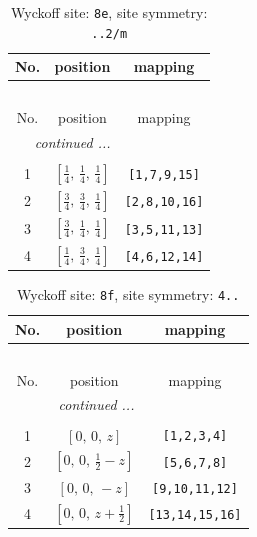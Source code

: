 \documentclass[fleqn,8pt]{jsarticle}
\begin{document}
\begin{longtable}{ccc}
\caption{Wyckoff site: {\tt 8e}, site symmetry: {\tt ..2/m}}
 \\
 \hline \hline
No. & position & mapping \\ \hline \endfirsthead

\multicolumn{2}{l}{\tablename\ \thetable{}} \\
 \hline \hline
No. & position & mapping \\ \hline \endhead

 \hline \hline
\multicolumn{2}{r}{\footnotesize\it continued ...} \\ \endfoot

 \hline \hline
\multicolumn{2}{r}{} \\ \endlastfoot

1 & $\left[ \frac{1}{4},\, \frac{1}{4},\, \frac{1}{4} \right]$ & {\tt [1,7,9,15]} \\ \hline
2 & $\left[ \frac{3}{4},\, \frac{3}{4},\, \frac{1}{4} \right]$ & {\tt [2,8,10,16]} \\ \hline
3 & $\left[ \frac{3}{4},\, \frac{1}{4},\, \frac{1}{4} \right]$ & {\tt [3,5,11,13]} \\ \hline
4 & $\left[ \frac{1}{4},\, \frac{3}{4},\, \frac{1}{4} \right]$ & {\tt [4,6,12,14]} \\
\end{longtable}
\renewcommand{\arraystretch}{1.2}
\begin{longtable}{ccc}
\caption{Wyckoff site: {\tt 8f}, site symmetry: {\tt 4..}}
 \\
 \hline \hline
No. & position & mapping \\ \hline \endfirsthead

\multicolumn{2}{l}{\tablename\ \thetable{}} \\
 \hline \hline
No. & position & mapping \\ \hline \endhead

 \hline \hline
\multicolumn{2}{r}{\footnotesize\it continued ...} \\ \endfoot

 \hline \hline
\multicolumn{2}{r}{} \\ \endlastfoot

1 & $\left[ 0,\, 0,\, z \right]$ & {\tt [1,2,3,4]} \\ \hline
2 & $\left[ 0,\, 0,\, \frac{1}{2} - z \right]$ & {\tt [5,6,7,8]} \\ \hline
3 & $\left[ 0,\, 0,\, - z \right]$ & {\tt [9,10,11,12]} \\ \hline
4 & $\left[ 0,\, 0,\, z + \frac{1}{2} \right]$ & {\tt [13,14,15,16]} \\
\end{longtable}
\end{document}
